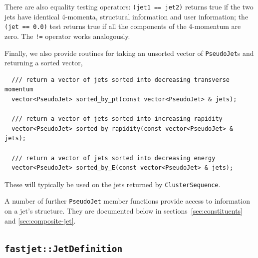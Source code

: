 \documentclass[12pt,a4]{article}
\newcommand{\ttt}[1]{{\small\texttt{#1}}}
\newcommand{\PJ}{\ttt{PseudoJet}\xspace}
\begin{document}
There are also equality testing operators: \ttt{(jet1 == jet2)}
returns true if the two jets have identical 4-momenta, structural
information and user information;
%
the \ttt{(jet == 0.0)} test returns true if all the components of the
4-momentum are zero.
%
The \ttt{!=} operator works analogously.

Finally, we also provide routines for taking an unsorted vector of
\ttt{PseudoJet}s and returning a sorted vector,
\begin{lstlisting}
  /// return a vector of jets sorted into decreasing transverse momentum
  vector<PseudoJet> sorted_by_pt(const vector<PseudoJet> & jets);
  
  /// return a vector of jets sorted into increasing rapidity
  vector<PseudoJet> sorted_by_rapidity(const vector<PseudoJet> & jets);
  
  /// return a vector of jets sorted into decreasing energy
  vector<PseudoJet> sorted_by_E(const vector<PseudoJet> & jets);
\end{lstlisting}
These will typically be used on the jets returned by
\ttt{ClusterSequence}.

A number of further \PJ member functions provide access to information
on a jet's structure. They are documented below in
sections~\ref{sec:constituents} and \ref{sec:composite-jet}.

\subsection{\tt fastjet::JetDefinition}
\label{sec:JetDefinition}
\end{document}
